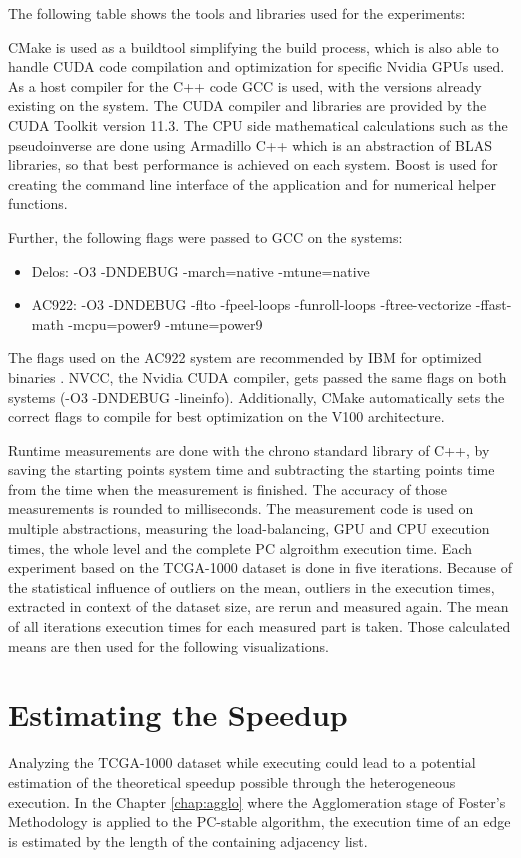 The following table shows the tools and libraries used for the experiments:


CMake is used as a buildtool simplifying the build process, which is also able to handle CUDA code compilation and optimization for specific Nvidia GPUs used. As a host compiler for the C++ code GCC is used, with the versions already existing on the system. The CUDA compiler and libraries are provided by the CUDA Toolkit version 11.3. The CPU side mathematical calculations such as the pseudoinverse are done using Armadillo C++ which is an abstraction of BLAS libraries, so that best performance is achieved on each system. Boost is used for creating the command line interface of the application and for numerical helper functions.

Further, the following flags were passed to GCC on the systems:
\begin{itemize}
  \item Delos: -O3 -DNDEBUG -march=native -mtune=native
  \item AC922: -O3 -DNDEBUG -flto -fpeel-loops -funroll-loops -ftree-vectorize -ffast-math -mcpu=power9 -mtune=power9
\end{itemize}
The flags used on the AC922 system are recommended by IBM for optimized binaries \cite{LinuxIBMPower}. NVCC, the Nvidia CUDA compiler, gets passed the same flags on both systems (-O3 -DNDEBUG -lineinfo). Additionally, CMake automatically sets the correct flags to compile for best optimization on the V100 architecture.

Runtime measurements are done with the chrono standard library of C++, by saving the starting points system time and subtracting the starting points time from the time when the measurement is finished. The accuracy of those measurements is rounded to milliseconds. The measurement code is used on multiple abstractions, measuring the load-balancing, GPU and CPU execution times, the whole level and the complete PC algroithm execution time.
Each experiment based on the TCGA-1000 dataset is done in five iterations.  Because of the statistical influence of outliers on the mean, outliers in the execution times, extracted in context of the dataset size, are rerun and measured again. The mean of all iterations execution times for each measured part is taken. Those calculated means are then used for the following visualizations.

\section{Estimating the Speedup}
\label{chap:est_speedup}
Analyzing the TCGA-1000 dataset while executing could lead to a potential estimation of the theoretical speedup possible through the heterogeneous execution. In the Chapter \ref{chap:agglo} where the Agglomeration stage of Foster's Methodology is applied to the PC-stable algorithm, the execution time of an edge is estimated by the length of the containing adjacency list.

